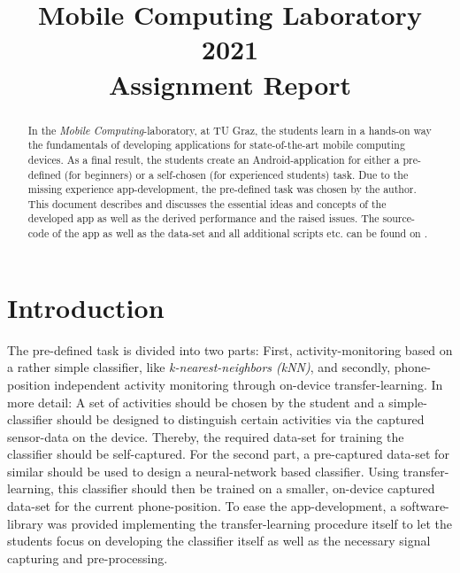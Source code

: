 \documentclass[journal]{IEEEtran}
\begin{document}
\title{Mobile Computing Laboratory 2021\\
Assignment Report}

\author{
}

\maketitle

\begin{abstract}
    In the \textit{Mobile Computing}-laboratory, at TU Graz, the students learn
    in a hands-on way the fundamentals of developing applications for
    state-of-the-art mobile computing devices. As a final result, the students
    create an Android-application for either a pre-defined (for beginners) or a
    self-chosen (for experienced students) task. Due to the missing experience
    app-development, the pre-defined task was chosen by the
    author.\newline
    This document describes and discusses the essential ideas and concepts of
    the developed app as well as the derived performance and the raised issues. \newline
    The source-code of the app as well as the data-set and all additional scripts etc. can 
    be found on \cite{lafer_mobile-computing_2021}.
\end{abstract}

\section{Introduction}
The pre-defined task is divided into two parts: First, activity-monitoring based
on a rather simple classifier, like \textit{k-nearest-neighbors (kNN)}, and
secondly, phone-position independent activity monitoring through on-device
transfer-learning.\newline
In more detail: A set of activities should be chosen by the student and a
simple-classifier should be designed to distinguish certain activities via the
captured sensor-data on the device. Thereby, the required data-set for training
the classifier should be self-captured. 
For the second part, a pre-captured data-set for similar should be used to
design a neural-network based classifier. Using transfer-learning, this
classifier should then be trained on a smaller, on-device captured data-set for
the current phone-position.\newline
To ease the app-development, a software-library was provided implementing
the transfer-learning procedure itself \cite{pavel_senchanka_example_2019} to let
the students focus on developing the classifier itself as well as the necessary
signal capturing and pre-processing. 
\end{document}
